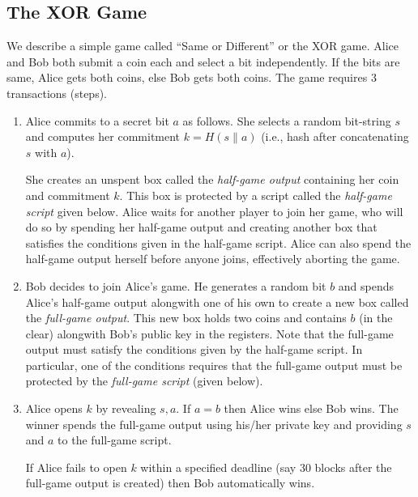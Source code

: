 \documentclass[11pt]{article}
\begin{document}
%
%

\subsection{The XOR Game}

We describe a simple game called ``Same or Different'' or the XOR game. Alice and Bob both submit a coin each and select a bit independently. If the bits are same, Alice gets both coins, else Bob gets both coins. The game requires 3 transactions (steps). 
\begin{enumerate}
	\item Alice commits to a secret bit $a$ as follows. She selects a random bit-string $s$ and computes her commitment $k = H(s\|a)$ (i.e., hash after concatenating $s$ with $a$).
	
	She creates an unspent box called the {\em half-game output} containing her coin and commitment $k$. This box is protected by a script called the {\em half-game script}  given below. Alice waits for another player to join her game, who will do so by spending her half-game output and creating another box that satisfies the conditions given in the half-game script. Alice can also spend the half-game output herself before anyone joins, effectively aborting the game. 
	
	\item Bob decides to join Alice's game. He generates a random bit $b$ and spends Alice's half-game output alongwith one of his own to create a new box called the {\em full-game output}. This new box  holds two coins and contains $b$ (in the clear) alongwith Bob's public key in the registers. 
	Note that the full-game output must satisfy the conditions given by the half-game script. In particular, one of the conditions requires that the full-game output must be protected by the {\em full-game script} (given below).
	\item Alice opens $k$ by revealing $s, a$. If $a = b$ then Alice wins else Bob wins. The winner spends the full-game output using his/her private key and providing $s$ and $a$ to the full-game script.

	If Alice fails to open $k$ within a specified deadline (say 30 blocks after the full-game output is created) then Bob automatically wins. 
\end{enumerate}
\end{document}
